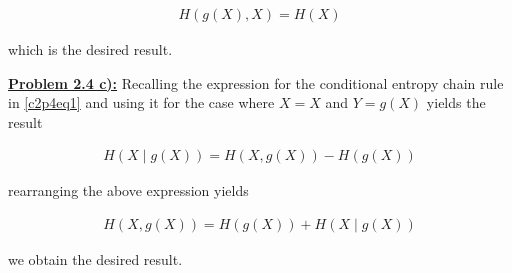 \documentclass{article}[12pt]
\numberwithin{equation}{subsection}
\newcommand{\prob}[1]{\textbf{\underline{Problem #1):}}}
\begin{document}
\begin{flushleft}
\begin{align*} 
H \left( g \left( X \right), X \right) = H \left( X \right)  
\end{align*}

which is the desired result.



\vspace{0.5in}

\prob{2.4 c}  Recalling the expression for the conditional entropy chain rule in \ref{c2p4eq1} and using it for the case where $X = X$ and $Y = g \left( X \right)$ yields the result

\begin{align*} 
H \left( X \mid g \left( X \right) \right) = H \left( X, g \left( X \right) \right) - H \left( g \left( X \right) \right)  
\end{align*}

rearranging the above expression yields 

\begin{align} \label{c2p4eq3}
H \left( X, g \left( X \right) \right) = H \left( g \left( X \right) \right) + H \left( X \mid g \left( X \right) \right)  \tag{2.4-3}
\end{align}

we obtain the desired result.



\vspace{0.5in}


\end{flushleft}
\end{document}
